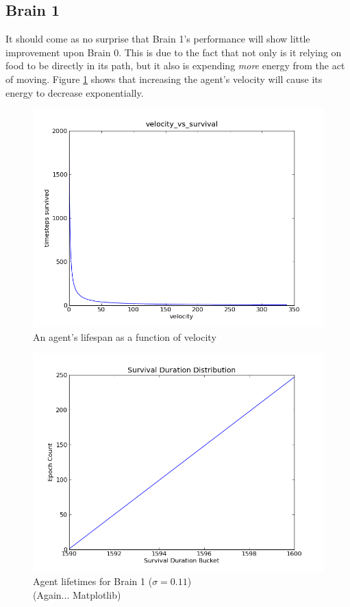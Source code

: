\subsection{Brain 1}
It should come as no surprise that Brain 1's performance will show
little improvement upon Brain 0. This is due to the fact that not only is
it relying on food to be directly in its path, but it also is expending 
\emph{more} energy from the act of moving. Figure \ref{fig:brain1velo} shows
that increasing the agent's velocity will cause its energy to decrease
exponentially.

\begin{figure}
\begin{center}
  \includegraphics[scale=.65]{plots/brain1velo.png}
  \caption{An agent's lifespan as a function of velocity}
  \label{fig:brain1velo}
\end{center}
\end{figure}

\begin{figure}
\begin{center}
  \includegraphics[scale=.65]{plots/brain1hist.png}
  \caption{Agent lifetimes for Brain 1 ($\sigma = 0.11$)\\
  (Again... Matplotlib)}
  \label{fig:brain1his}
\end{center}
\end{figure}

